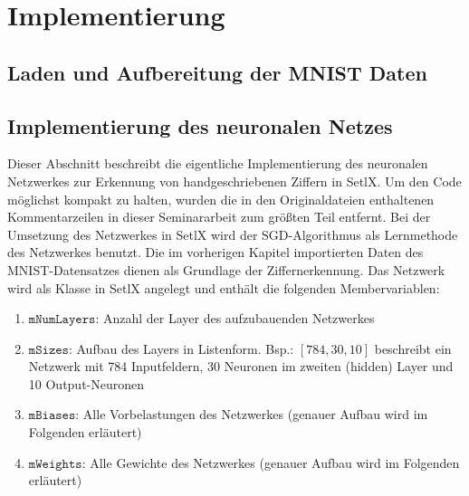 \chapter{Implementierung}

\section{Laden und Aufbereitung der MNIST Daten}

\section{Implementierung des neuronalen Netzes}
Dieser Abschnitt beschreibt die eigentliche Implementierung des neuronalen Netzwerkes zur Erkennung von handgeschriebenen Ziffern in SetlX. Um den Code möglichst kompakt zu halten, wurden die in den Originaldateien enthaltenen Kommentarzeilen in dieser Seminararbeit zum größten Teil entfernt.
Bei der Umsetzung des Netzwerkes in SetlX wird der SGD-Algorithmus als Lernmethode des Netzwerkes benutzt. Die im vorherigen Kapitel importierten Daten des MNIST-Datensatzes dienen als Grundlage der Ziffernerkennung. 
Das Netzwerk wird als Klasse in SetlX angelegt und enthält die folgenden Membervariablen:

\begin{enumerate}
\item $\mathtt{mNumLayers}$: Anzahl der Layer des aufzubauenden Netzwerkes 
\item $\mathtt{mSizes}$: Aufbau des Layers in Listenform. Bsp.: $[784, 30, 10]$ beschreibt ein Netzwerk mit 784 Inputfeldern, 30 Neuronen im zweiten (hidden) Layer und 10 Output-Neuronen
\item $\mathtt{mBiases}$: Alle Vorbelastungen des Netzwerkes (genauer Aufbau wird im Folgenden erläutert)
\item $\mathtt{mWeights}$: Alle Gewichte des Netzwerkes (genauer Aufbau wird im Folgenden erläutert)
\end{enumerate}

